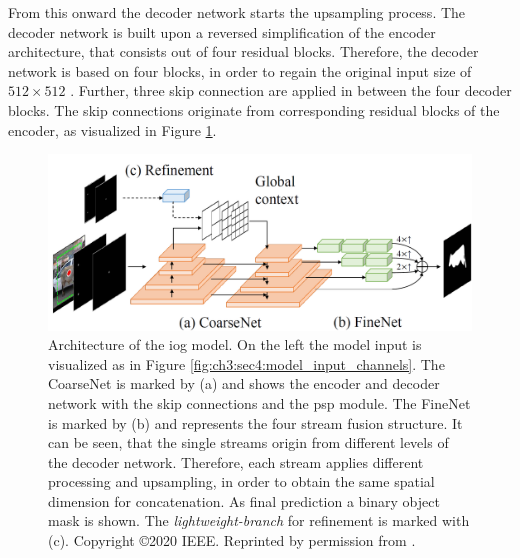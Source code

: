 From this onward the decoder network starts the upsampling process.
The decoder network is built upon a reversed simplification of the encoder architecture, that consists out of four residual blocks.
Therefore, the decoder network is based on four blocks, in order to regain the original input size of  $512 \times 512$ .
Further, three skip connection are applied in between the four decoder blocks.
The skip connections originate from corresponding residual blocks of the encoder, as visualized in Figure \ref{fig:ch3:sec4:arch}.
\begin{figure}
	\includegraphics[width=\linewidth]{figures/chap34_iog_arch.png}
	\caption[IOG Architecture]{		
		Architecture of the \gls{iog} model.
		On the left the model input is visualized as in Figure \ref{fig:ch3:sec4:model_input_channels}.
		The CoarseNet is marked by (a) and shows the encoder and decoder network with the skip connections and the \gls{psp} module.
		The FineNet is marked by (b) and represents the four stream fusion structure.
		It can be seen, that the single streams origin from different levels of the decoder network.
		Therefore, each stream applies different processing and upsampling, in order to obtain the same spatial dimension for concatenation.		
		As final prediction a binary object mask is shown.
		The \textit{lightweight-branch} for refinement is marked with (c).
		Copyright \copyright 2020 IEEE. Reprinted by permission from \cite{Zha20-IOG}.
	}
	\label{fig:ch3:sec4:arch}
\end{figure}

